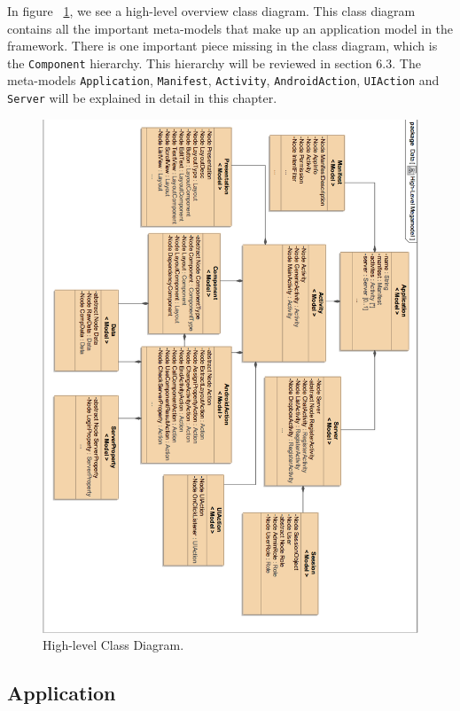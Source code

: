 In figure ~\ref{fig:highlevel_mm}, we see a high-level overview class diagram. This class diagram contains all the important meta-models that make up an application model in the framework. There is one important piece missing in the class diagram, which is the \texttt{Component} hierarchy. This hierarchy will be reviewed in section 6.3. The meta-models \texttt{Application}, \texttt{Manifest}, \texttt{Activity}, \texttt{AndroidAction}, \texttt{UIAction} and \texttt{Server} will be explained in detail in this chapter. 
\begin{figure}[h!]
\centering
\includegraphics[width=1.02\textwidth]{images/chap6_high_level.png}
\caption{High-level Class Diagram.}
\label{fig:highlevel_mm}
\end{figure}

\subsection{Application}


